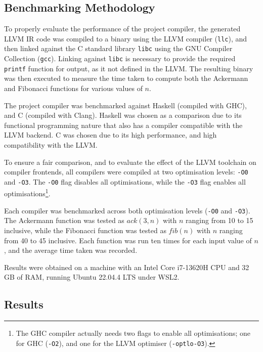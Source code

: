 \subsection{Benchmarking Methodology}

To properly evaluate the performance of the project compiler, the generated LLVM IR code was
compiled to a binary using the LLVM compiler (\texttt{llc}), and then linked against the C standard
library \texttt{libc} using the GNU Compiler Collection (\texttt{gcc}). Linking against
\texttt{libc} is necessary to provide the required \texttt{printf} function for output, as it not
defined in the LLVM. The resulting binary was then executed to measure the time taken to compute
both the Ackermann and Fibonacci functions for various values of $n$.

The project compiler was benchmarked against Haskell (compiled with GHC), and C (compiled with
Clang). Haskell was chosen as a comparison due to its functional programming nature that also has a
compiler compatible with the LLVM backend. C was chosen due to its high performance, and high
compatibility with the LLVM.

To ensure a fair comparison, and to evaluate the effect of the LLVM toolchain on compiler frontends,
all compilers were compiled at two optimisation levels: \texttt{-O0} and \texttt{-O3}. The
\texttt{-O0} flag disables all optimisations, while the \texttt{-O3} flag enables all
optimisations\footnote{The GHC compiler actually needs two flags to enable all optimisations; one
for GHC (\texttt{-O2}), and one for the LLVM optimiser (\texttt{-optlo-O3}).}.

Each compiler was benchmarked across both optimisation levels (\texttt{-O0} and \texttt{-O3}). The
Ackermann function was tested as $ack(3,n)$ with $n$ ranging from 10 to 15 inclusive, while the
Fibonacci function was tested as $fib(n)$ with $n$ ranging from 40 to 45 inclusive. Each function
was run ten times for each input value of $n$, and the average time taken was recorded.

Results were obtained on a machine with an Intel Core i7-13620H CPU and 32 GB of RAM, running Ubuntu
22.04.4 LTS under WSL2.

\subsection{Results}

